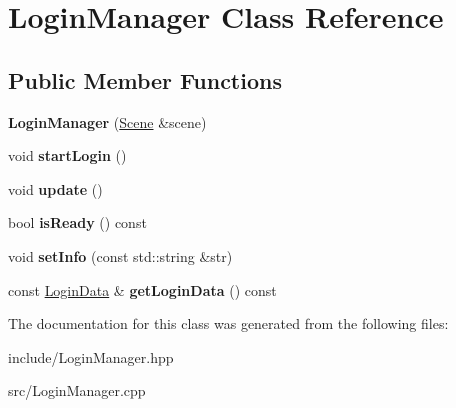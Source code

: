 \hypertarget{class_login_manager}{\section{Login\-Manager Class Reference}
\label{class_login_manager}
}
\subsection*{Public Member Functions}
\begin{DoxyCompactItemize}
\item 
\hypertarget{class_login_manager_a07c6ed7418563228c5363f747881f21c}{{\bfseries Login\-Manager} (\hyperlink{class_scene}{Scene} \&scene)}\label{class_login_manager_a07c6ed7418563228c5363f747881f21c}

\item 
\hypertarget{class_login_manager_a02d6281eb972d7f8ca2f9ed8e5dda004}{void {\bfseries start\-Login} ()}\label{class_login_manager_a02d6281eb972d7f8ca2f9ed8e5dda004}

\item 
\hypertarget{class_login_manager_a10d714dbb98297062347abd72f406d1d}{void {\bfseries update} ()}\label{class_login_manager_a10d714dbb98297062347abd72f406d1d}

\item 
\hypertarget{class_login_manager_a23316e629bf47d1ae734299b8b459a04}{bool {\bfseries is\-Ready} () const }\label{class_login_manager_a23316e629bf47d1ae734299b8b459a04}

\item 
\hypertarget{class_login_manager_a3961de36bbe58ca2f3c70dfd8a8a89ea}{void {\bfseries set\-Info} (const std\-::string \&str)}\label{class_login_manager_a3961de36bbe58ca2f3c70dfd8a8a89ea}

\item 
\hypertarget{class_login_manager_a6faa15eb60bd30575751e255b43ab3a0}{const \hyperlink{struct_login_data}{Login\-Data} \& {\bfseries get\-Login\-Data} () const }\label{class_login_manager_a6faa15eb60bd30575751e255b43ab3a0}

\end{DoxyCompactItemize}


The documentation for this class was generated from the following files\-:\begin{DoxyCompactItemize}
\item 
include/Login\-Manager.\-hpp\item 
src/Login\-Manager.\-cpp\end{DoxyCompactItemize}
